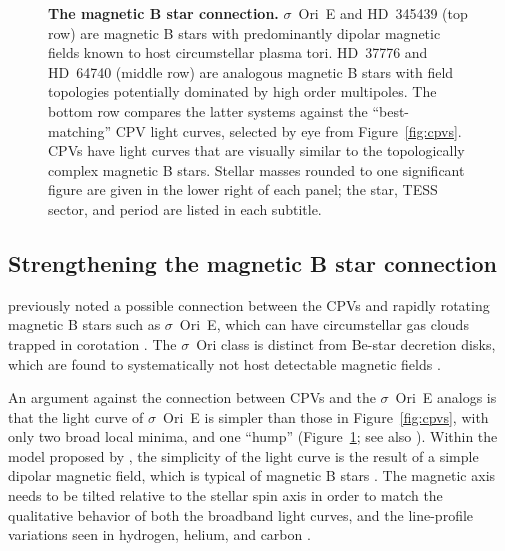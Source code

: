 \documentclass[11pt,twocolumn,tighten,linenumbers]{aastex63}
\begin{document}
\begin{figure}[!th]
	\begin{center}
		\centering
			
		\vspace{-0.34cm}

		\vspace{-0.34cm}

		\vspace{-0.1cm}
		\caption{
      {\bf The magnetic B star connection.}
      $\sigma$~Ori~E and HD~345439 (top row) are magnetic B stars with
      predominantly dipolar magnetic fields known to host
      circumstellar plasma tori.  HD~37776 and HD~64740 (middle row)
      are analogous magnetic B stars with field topologies potentially
      dominated by high order multipoles.  The bottom row compares the
      latter systems against the ``best-matching'' CPV light curves,
      selected by eye from Figure~\ref{fig:cpvs}.  CPVs have light
      curves that are visually similar to the topologically complex
      magnetic B stars.  Stellar masses rounded to one significant
      figure are given in the lower right of each panel; the star,
      TESS sector, and period are listed in each subtitle.
		}
		\label{fig:bstar}
	\end{center}
\end{figure}


\subsection{Strengthening the magnetic B star connection}
\label{subsec:bstardisc}

\citet{2017AJ....153..152S} previously noted a possible connection
between the CPVs and rapidly rotating magnetic B stars such as
$\sigma$~Ori~E, which can have circumstellar gas clouds trapped in
corotation \citep{2005ApJ...630L..81T}.  The $\sigma$~Ori class is
distinct from Be-star decretion disks, which are found to
systematically not host detectable magnetic fields
\citep{2013A&ARv..21...69R,2016ASPC..506..207W}.

An argument against the connection between CPVs and the $\sigma$~Ori~E
analogs is that the light curve of $\sigma$~Ori~E is simpler than
those in Figure~\ref{fig:cpvs}, with only two broad local minima, and
one ``hump'' (Figure~\ref{fig:bstar}; see also
\citealt{2022ApJ...924L..10J}).  Within the model proposed by
\citeauthor{2005ApJ...630L..81T}, the simplicity of the light curve is
the result of a simple dipolar magnetic field, which is typical of
magnetic B stars \citep{2007A&A...475.1053A,2009ARA&A..47..333D}.  The
magnetic axis needs to be tilted relative to the stellar spin axis in
order to match the qualitative behavior of both the broadband light
curves, and the line-profile variations seen in hydrogen, helium, and
carbon \citep{2012MNRAS.419..959O}.
\end{document}
